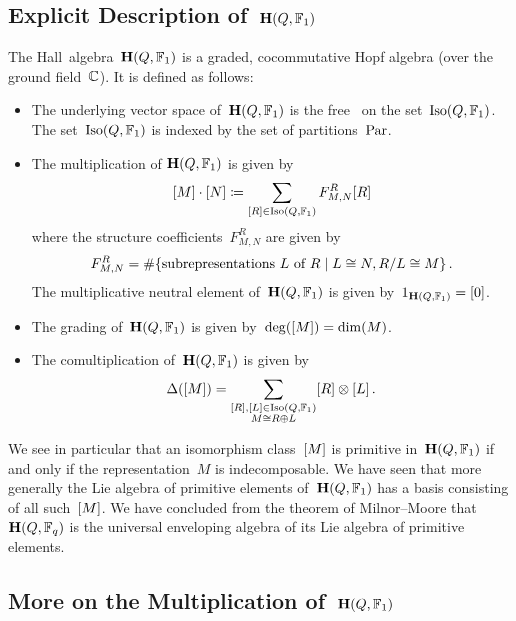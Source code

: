 \documentclass[a4paper, 11pt, twoside=semi]{scrartcl}
\begin{document}
\subsection{Explicit Description of~$\mathbf{H}(Q, \mathbb{F}_1)$}
\label{explicit description of hall algebra over F1}

The Hall~algebra~$\mathbf{H}(Q, \mathbb{F}_1)$ is a graded, cocommutative Hopf algebra (over the ground field~$\Complex$).
It is defined as follows:
\begin{itemize}
  \item
    The underlying vector space of~$\mathbf{H}(Q, \mathbb{F}_1)$ is the free~\vectorspace{$\Complex$} on the set~$\operatorname{Iso}(Q, \mathbb{F}_1)$.
    The set~$\operatorname{Iso}(Q, \mathbb{F}_1)$ is indexed by the set of partitions~$\mathrm{Par}$.
  \item
    The multiplication of$~\mathbf{H}(Q, \mathbb{F}_1)$ is given by
    \[
      [M] \cdot [N]
      \coloneqq
      \sum_{[R] \in \operatorname{Iso}(Q, \mathbb{F}_1)}
      F^R_{M,N} [R]
    \]
    where the structure coefficients~$F^R_{M,N}$ are given by
    \[
      F^R_{M,N}
      =
      \counting
      \{
        \text{subrepresentations~$L$ of~$R$}
      \suchthat
        L \cong N, R/L \cong M
      \} \,.
    \]
    The multiplicative neutral element of~$\mathbf{H}(Q, \mathbb{F}_1)$ is given by~$1_{\mathbf{H}(Q, \mathbb{F}_1)} = [0]$.
  \item
    The grading of~$\mathbf{H}(Q, \mathbb{F}_1)$ is given by~$\deg( [M] ) = \dim(M)$.
  \item
    The comultiplication of~$\mathbf{H}(Q, \mathbb{F}_1)$ is given by
    \[
      \Delta( [M] )
      =
      \sum_{
        \substack{
          [R], [L] \in \operatorname{Iso}(Q, \mathbb{F}_1) \\
          M \cong R \oplus L
        }
      }
      [R] \otimes [L] \,.
    \]
\end{itemize}

We see in particular that an isomorphism class~$[M]$ is primitive in~$\mathbf{H}(Q, \mathbb{F}_1)$ if and only if the representation~$M$ is indecomposable.
We have seen that more generally the Lie algebra of primitive elements of~$\mathbf{H}(Q, \mathbb{F}_1)$ has a basis consisting of all such~$[M]$.
We have concluded from the theorem of Milnor--Moore that~$\mathbf{H}(Q, \mathbb{F}_q)$ is the universal enveloping algebra of its Lie algebra of primitive elements.



\subsection{More on the Multiplication of~$\mathbf{H}(Q, \mathbb{F}_1)$}
\label{more on multiplication}
\end{document}
